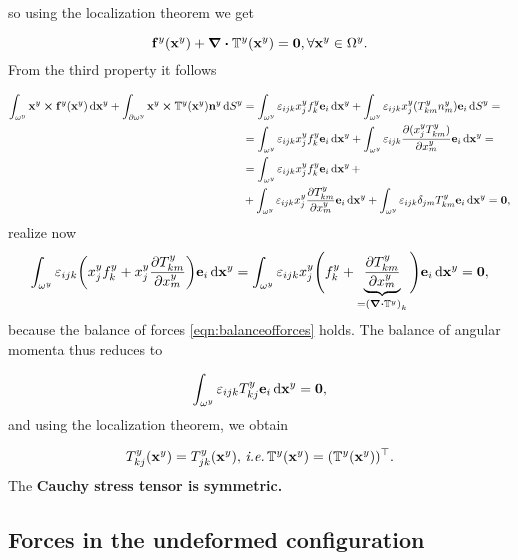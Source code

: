 \documentclass[11pt]{scrartcl} %
\begin{document}
so using the localization theorem we get

\begin{equation}
	\label{eqn:balanceofforces}
	\vb{f}^y(\vb{x}^y) + \divergence{\cstress\qty(\vb{x}^{y})} = \vb{0}, \forall \vb{x}^y \in \Omega^y.
\end{equation}
From the third property it follows

\begin{align*}
	\int_{\omega^y} \vb{x}^y \cross \vb{f}^y(\vb{x}^y) \dd{\vb{x}^y} + \int_{\partial \omega^y} \vb{x}^y \cross \mathbb{T}^y(\vb{x}^y) \vb{n}^{y} \dd{S}^y &= \int_{\omega^y} \varepsilon_{ijk} x^y_j f^y_k \vb{e}_i \dd{\vb{x}^y} + \int_{\omega^y}\varepsilon_{ijk}x^y_j (T^y_{km} n^y_m) \vb{e}_i\dd{S}^y = \\
																				&=\int_{\omega^y} \varepsilon_{ijk} x^y_j f^y_k \vb{e}_i \dd{\vb{x}^y} + \int_{\omega^y} \varepsilon_{ijk} \pdv{(x^y_j T^y_{km})}{x^y_m} \vb{e}_i\dd{\vb{x}^y} = \\
																				&= \int_{\omega^y}\varepsilon_{ijk}x^y_j f^y_k \vb{e}_i \dd{\vb{x}^y} +\\
																				&+\int_{\omega^y}\varepsilon_{ijk}x^y_j \pdv{T_{km}^{y}}{x^y_m}\vb{e}_i\dd{\vb{x}^y}  + \int_{\omega^y}\varepsilon_{ijk}\delta_{jm}T^y_{km} \vb{e}_i \dd{\vb{x}^y} = \vb{0},
\end{align*}
realize now
\[
	\int_{\omega^{y}}\varepsilon_{ijk}\qty(x^{y}_j f^{y}_k + x^{y}_j \pdv{T_{km}^{y}}{x^{y}_m})\vb{e}_i\dd{\vb{x}^{y}} = \int_{\omega^{y}}\varepsilon_{ijk}x_j^{y}\Bigg(f^{y}_k + \underbrace{\pdv{T_{km}^{y}}{x^{y}_m}}_{= \qty(\divergence{\cstress})_k}\Bigg)\vb{e}_i\dd{\vb{x}^{y}} = \vb{0},
\]
because the balance of forces \ref{eqn:balanceofforces} holds. The balance of angular momenta thus reduces to

\begin{equation*}
	\int_{\omega^y} \varepsilon_{ijk}T^y_{kj} \vb{e}_i \dd{\vb{x}^{y}}= \vb{0},
\end{equation*}
and using the localization theorem, we obtain

\begin{equation}
	\label{eq:balance_of_angular_momenta}
	T^y_{kj} (\vb{x}^y) = T^y_{jk}(\vb{x}^y), \, \text{\textit{i.e.}} \, \mathbb{T}^y(\vb{x}^y) = (\mathbb{T}^y(\vb{x}^y))^\top.
\end{equation}
The \textbf{Cauchy stress tensor is symmetric.}

\subsection{Forces in the undeformed configuration}
\label{sec:forces_undeformed}
\end{document}
